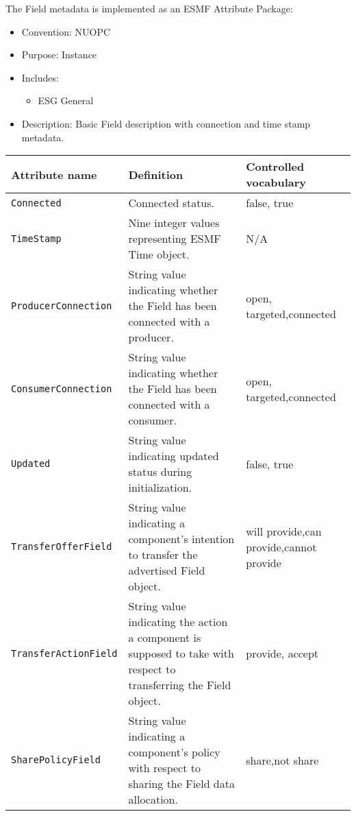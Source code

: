 \label{FieldMeta}
The Field metadata is implemented as an ESMF Attribute Package:

\begin{itemize}
    \item Convention: NUOPC
    \item Purpose: Instance
    \item Includes:
    \begin{itemize}
        \item ESG General
    \end{itemize} 
    \item Description: Basic Field description with connection and time stamp metadata. 
\end{itemize}

\begin{longtable}{|p{}|p{}|p{}|}
     \hline\hline
     {\bf Attribute name} & {\bf Definition} & {\bf Controlled vocabulary}\\
     \hline\hline
     {\tt Connected} & Connected status.& false, true\\ \hline
     {\tt TimeStamp} & Nine integer values representing ESMF Time object.& N/A\\ \hline
     {\tt ProducerConnection} & String value indicating whether the Field has been connected with a producer. & open, targeted,\newline connected\\ \hline
     {\tt ConsumerConnection} & String value indicating whether the Field has been connected with a consumer.& open, targeted,\newline connected\\ \hline
     {\tt Updated} & String value indicating updated status during initialization.& false, true\\ \hline
     {\tt TransferOfferField} & String value indicating a component's intention to transfer the advertised Field object.& will provide,\newline can provide,\newline cannot provide\\ \hline
     {\tt TransferActionField} & String value indicating the action a component is supposed to take with respect to transferring the Field object.& provide, accept\\ \hline
     {\tt SharePolicyField} & String value indicating a component's policy with respect to sharing the Field data allocation.& share,\newline not share\\ \hline

\end{longtable}
